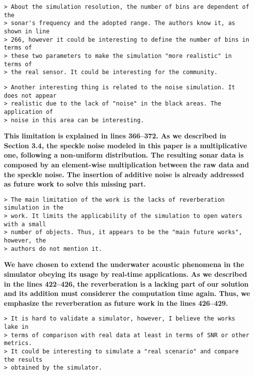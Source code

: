 \documentclass{article}
\begin{document}

\begin{verbatim}
> About the simulation resolution, the number of bins are dependent of the
> sonar's frequency and the adopted range. The authors know it, as shown in line
> 266, however it could be interesting to define the number of bins in terms of
> these two parameters to make the simulation "more realistic" in terms of
> the real sensor. It could be interesting for the community.
\end{verbatim}


\begin{verbatim}
> Another interesting thing is related to the noise simulation. It does not appear
> realistic due to the lack of "noise" in the black areas. The application of
> noise in this area can be interesting.
\end{verbatim}

\textbf{This limitation is explained in lines 366--372. As we described in
Section 3.4, the speckle noise modeled in this paper is a multiplicative one,
following a non-uniform distribution. The resulting sonar data is composed by
an element-wise multiplication between the raw data and the speckle noise. The
insertion of additive noise is already addressed as future work to solve this
missing part.}

\begin{verbatim}
> The main limitation of the work is the lacks of reverberation simulation in the
> work. It limits the applicability of the simulation to open waters with a small
> number of objects. Thus, it appears to be the "main future works", however, the
> authors do not mention it.
\end{verbatim}

\textbf{We have chosen to extend the underwater acoustic phenomena in the
simulator obeying its usage by real-time applications. As we described in
the lines 422--426, the reverberation is a lacking part of our solution and
its addition must considerer the computation time again. Thus, we emphasize
the reverberation as future work in the lines 426--429.}

\begin{verbatim}
> It is hard to validate a simulator, however, I believe the works lake in
> terms of comparison with real data at least in terms of SNR or other metrics.
> It could be interesting to simulate a "real scenario" and compare the results
> obtained by the simulator.
\end{verbatim}
\end{document}

